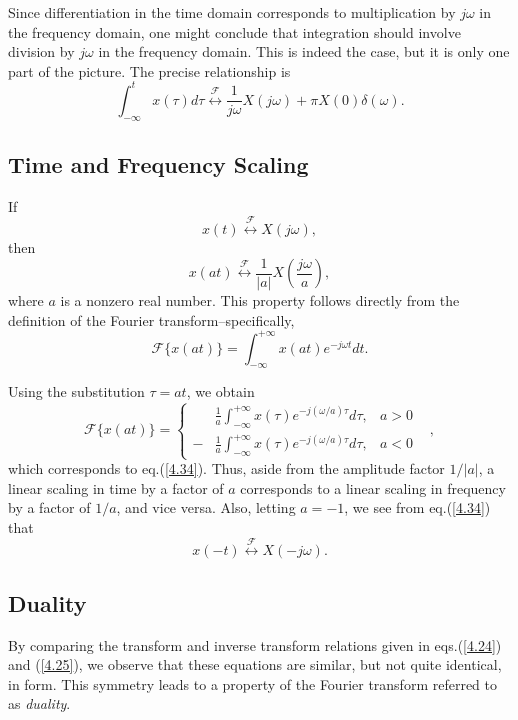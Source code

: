 \documentclass[a4paper,twoside]{book}
\begin{document}
Since differentiation in the time domain corresponds to multiplication by $j\omega$ in the frequency domain, one might conclude that integration should involve division by $j\omega$ in the frequency domain. This is indeed the case, but it is only one part of the picture. The precise relationship is
\begin{equation}
    \boxed{\int_{-\infty}^tx(\tau)d\tau\overset{\mathcal{F}}{\longleftrightarrow}\frac1{j\omega}X(j\omega)+\pi X(0)\delta(\omega).}
    \label{4.32}
\end{equation}

\subsection{Time and Frequency Scaling}

If $$x(t)\overset{\mathcal{F}}{\longleftrightarrow}X(j\omega),$$ then
\begin{equation}
    \boxed{x(at)\overset{\mathcal{F}}{\longleftrightarrow}\dfrac1{|a|}X\left(\dfrac{j\omega}a\right),}
    \label{4.34}
\end{equation}
where $a$ is a nonzero real number. This property follows directly from the definition of the Fourier transform--specifically, $$\mathcal{F}\{x(at)\}=\int_{-\infty}^{+\infty}x(at)e^{-j\omega t}dt.$$

Using the substitution $\tau=at$, we obtain $$\mathcal{F}\{x(at)\}=\left\{\begin{aligned}&\frac1a\int_{-\infty}^{+\infty}x(\tau)e^{-j(\omega/a)\tau}d\tau,&a>0\\-&\frac1a\int_{-\infty}^{+\infty}x(\tau)e^{-j(\omega/a)\tau}d\tau,&a<0&\end{aligned}\right.,$$ which corresponds to eq.\;(\ref{4.34}). Thus, aside from the amplitude factor $1/|a|$, a linear scaling in time by a factor of $a$ corresponds to a linear scaling in frequency by a factor of $1/a$, and vice versa. Also, letting $a=-1$, we see from eq.\;(\ref{4.34}) that
\begin{equation}
    \boxed{x(-t)\overset{\mathcal{F}}{\longleftrightarrow}X(-j\omega).}
    \label{4.35}
\end{equation}

\subsection{Duality}

By comparing the transform and inverse transform relations given in eqs.\;(\ref{4.24}) and (\ref{4.25}), we observe that these equations are similar, but not quite identical, in form. This symmetry leads to a property of the Fourier transform referred to as \textit{duality}.
\end{document}
